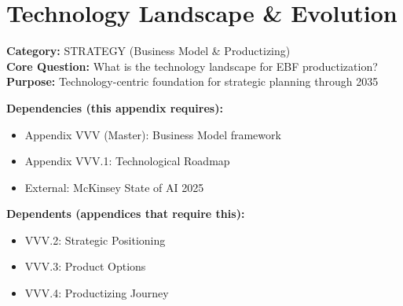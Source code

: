 \section{Technology Landscape \& Evolution}
\label{sec:vvv0-technology-landscape}


\begin{tcolorbox}[colback=gray!5!white, colframe=gray!75!black,
    title=\textbf{Appendix: VVV.0 STRATEGY-TECH}]

\textbf{Category:} STRATEGY (Business Model \& Productizing) \\
\textbf{Core Question:} What is the technology landscape for EBF productization? \\
\textbf{Purpose:} Technology-centric foundation for strategic planning through 2035

\end{tcolorbox}


\begin{tcolorbox}[colback=yellow!5!white, colframe=yellow!75!black,
    title=\textbf{Cross-Reference Map}]

\textbf{Dependencies (this appendix requires):}
\begin{itemize}[nosep]
    \item Appendix VVV (Master): Business Model framework
    \item Appendix VVV.1: Technological Roadmap
    \item External: McKinsey State of AI 2025
\end{itemize}

\textbf{Dependents (appendices that require this):}
\begin{itemize}[nosep]
    \item VVV.2: Strategic Positioning
    \item VVV.3: Product Options
    \item VVV.4: Productizing Journey
\end{itemize}

\end{tcolorbox}


